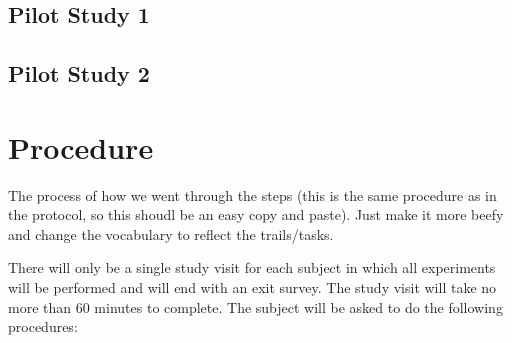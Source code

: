 \subsection{Pilot Study 1}

\subsection{Pilot Study 2}

\section{Procedure}

The process of how we went through the steps (this is the same procedure as in the protocol, so this shoudl be an easy copy and paste). Just make it more beefy and change the vocabulary to reflect the trails/tasks.

There will only be a single study visit for each subject in which all experiments will be performed and will end with an exit survey. The study visit will take no more than 60 minutes to complete. The subject will be asked to do the following procedures:

